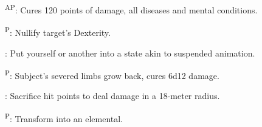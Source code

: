 \begin{enumerate*}
\item {}\textsuperscript{AP}: Cures 120 points of damage, all diseases and mental conditions.

      \textsuperscript{P}: Nullify target's Dexterity.

      : Put yourself or another into a state akin to suspended animation. %

\item {}\textsuperscript{P}: Subject's severed limbs grow back, cures 6d12 damage.

\item {}: Sacrifice hit points to deal damage in a 18-meter radius.

\item {}\textsuperscript{P}: Transform into an elemental.
\end{enumerate*}


